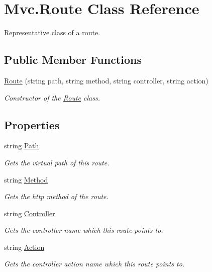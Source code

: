 \hypertarget{class_mvc_1_1_route}{}\section{Mvc.\+Route Class Reference}
\label{class_mvc_1_1_route}


Representative class of a route.  


\subsection*{Public Member Functions}
\begin{DoxyCompactItemize}
\item 
\hyperlink{class_mvc_1_1_route_ac6720c3e974719c7a0e0137e62834e33}{Route} (string path, string method, string controller, string action)
\begin{DoxyCompactList}\small\item\em Constructor of the \hyperlink{class_mvc_1_1_route}{Route} class. \end{DoxyCompactList}\end{DoxyCompactItemize}
\subsection*{Properties}
\begin{DoxyCompactItemize}
\item 
string \hyperlink{class_mvc_1_1_route_a7dc92739ebd8410bc2cffc26e14a76bf}{Path}
\begin{DoxyCompactList}\small\item\em Gets the virtual path of this route. \end{DoxyCompactList}\item 
string \hyperlink{class_mvc_1_1_route_a29c932cbf29b1b8f2abcd8a4ca3c3c39}{Method}
\begin{DoxyCompactList}\small\item\em Gets the http method of the route. \end{DoxyCompactList}\item 
string \hyperlink{class_mvc_1_1_route_a2dcaf1f94a1c5698dcfaf9a31f4c4a91}{Controller}
\begin{DoxyCompactList}\small\item\em Gets the controller name which this route points to. \end{DoxyCompactList}\item 
string \hyperlink{class_mvc_1_1_route_a0b927b19bf034277e1e50494538fd1b1}{Action}
\begin{DoxyCompactList}\small\item\em Gets the controller action name which this route points to. \end{DoxyCompactList}\end{DoxyCompactItemize}


